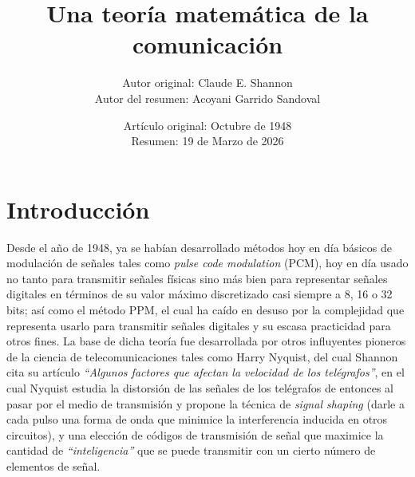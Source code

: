 \documentclass[spanish]{article}
\begin{document}
\title {Una teoría matemática de la comunicación}
\author {Autor original: Claude E. Shannon \\ Autor del resumen: Acoyani Garrido Sandoval}
\date {Artículo original: Octubre de 1948 \\ Resumen: 19 de Marzo de 2026}
\maketitle

\section {Introducción}

Desde el año de 1948, ya se habían desarrollado métodos hoy en día básicos de modulación de señales tales como \textit{pulse code modulation} (PCM), hoy en día usado no tanto para transmitir señales físicas sino más bien para representar señales digitales en términos de su valor máximo discretizado casi siempre a 8, 16 o 32 bits; así como el método PPM, el cual ha caído en desuso por la complejidad que representa usarlo para transmitir señales digitales y su escasa practicidad para otros fines. La base de dicha teoría fue desarrollada por otros influyentes pioneros de la ciencia de telecomunicaciones tales como Harry Nyquist, del cual Shannon cita su artículo \textit{``Algunos factores que afectan la velocidad de los telégrafos''}, en el cual Nyquist estudia la distorsión de las señales de los telégrafos de entonces al pasar por el medio de transmisión y propone la técnica de \textit{signal shaping} (darle a cada pulso una forma de onda que minimice la interferencia inducida en otros circuitos), y una elección de códigos de transmisión de señal que maximice la cantidad de \textit{``inteligencia''} que se puede transmitir con un cierto número de elementos de señal.
\end{document}
